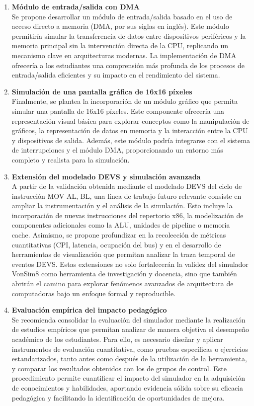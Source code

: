 \documentclass[12pt,oneside]{templates/unerthesis}
\begin{document}
\begin{enumerate}
\item
  \textbf{Módulo de entrada/salida con DMA}\\
  Se propone desarrollar un módulo de entrada/salida basado en el uso de acceso directo a memoria (DMA, por sus siglas en inglés). Este módulo permitiría simular la transferencia de datos entre dispositivos periféricos y la memoria principal sin la intervención directa de la CPU, replicando un mecanismo clave en arquitecturas modernas. La implementación de DMA ofrecería a los estudiantes una comprensión más profunda de los procesos de entrada/salida eficientes y su impacto en el rendimiento del sistema.
\item
  \textbf{Simulación de una pantalla gráfica de 16x16 píxeles}\\
  Finalmente, se plantea la incorporación de un módulo gráfico que permita simular una pantalla de 16x16 píxeles. Este componente ofrecería una representación visual básica para explorar conceptos como la manipulación de gráficos, la representación de datos en memoria y la interacción entre la CPU y dispositivos de salida. Además, este módulo podría integrarse con el sistema de interrupciones y el módulo DMA, proporcionando un entorno más completo y realista para la simulación.
\item
  \textbf{Extensión del modelado DEVS y simulación avanzada}\\
  A partir de la validación obtenida mediante el modelado DEVS del ciclo de instrucción MOV AL, BL, una línea de trabajo futuro relevante consiste en ampliar la instrumentación y el análisis de la simulación. Esto incluye la incorporación de nuevas instrucciones del repertorio x86, la modelización de componentes adicionales como la ALU, unidades de pipeline o memoria cache. Asimismo, se propone profundizar en la recolección de métricas cuantitativas (CPI, latencia, ocupación del bus) y en el desarrollo de herramientas de visualización que permitan analizar la traza temporal de eventos DEVS. Estas extensiones no solo fortalecerán la validez del simulador VonSim8 como herramienta de investigación y docencia, sino que también abrirán el camino para explorar fenómenos avanzados de arquitectura de computadoras bajo un enfoque formal y reproducible.
\item
  \textbf{Evaluación empírica del impacto pedagógico}\\
  Se recomienda consolidar la evaluación del simulador mediante la realización de estudios empíricos que permitan analizar de manera objetiva el desempeño académico de los estudiantes. Para ello, es necesario diseñar y aplicar instrumentos de evaluación cuantitativa, como pruebas específicas o ejercicios estandarizados, tanto antes como después de la utilización de la herramienta, y comparar los resultados obtenidos con los de grupos de control. Este procedimiento permite cuantificar el impacto del simulador en la adquisición de conocimientos y habilidades, aportando evidencia sólida sobre su eficacia pedagógica y facilitando la identificación de oportunidades de mejora.
\end{enumerate}
\end{document}
